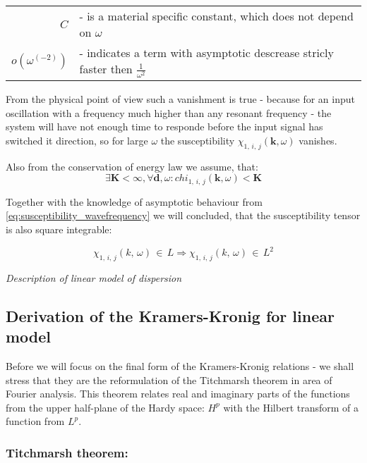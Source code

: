 \documentclass[12pt,twoside,a4paper]{article}
\numberwithin{equation}{subsection}
\numberwithin{figure}{subsection}
\begin{document}
\begin{tabular}{r l}
  $C$ & - is a material specific constant, which does not depend on $\omega $ \\
  $o(\omega ^{( - 2)})$ & - indicates a term with asymptotic descrease stricly faster then $\frac {1}{\omega ^{2}}$ \\
\end{tabular}


From the physical point of view such a vanishment is true - because for an input oscillation with a frequency much higher than any
resonant frequency - the system will have not enough time to responde before the input signal has switched it direction, so for large
$\omega $ the susceptibility ${\chi_{1, \,i, \,j}}(\textbf{k},\omega )$ vanishes.


Also from the conservation of energy law we assume, that:
\begin{equation} \label{eq:susceptibility_conservation}
  \exists \textbf{K} < \infty, \forall \textbf{d}, \omega : chi_{1, \,i, \,j}(\textbf{k}, \omega) < \textbf{K}
\end{equation}


Together with the knowledge of asymptotic behaviour from \ref{eq:susceptibility_wavefrequency} we will concluded, that the susceptibility
tensor is also square integrable:

\begin{equation} \label{eq:susceptibility_sqrintegrable}
  \chi_{1, \,i, \,j}(k, \,\omega ) \,\in \,L \Rightarrow \chi_{1, \,i, \,j} (k, \,\omega )\,\in\,L^{2}
\end{equation}


\textit{Description of linear model of dispersion}

\subsection{Derivation of the Kramers-Kronig for linear model} \label{chap:problem_dlin}

Before we will focus on the final form of the Kramers-Kronig relations - we shall stress that they are the reformulation of the Titchmarsh theorem
in area of Fourier analysis. This theorem relates real and imaginary parts of the functions from the upper half-plane of the Hardy space:
$H^{p}$ with the Hilbert transform of a function from $L^{p}$.

\subsubsection*{Titchmarsh theorem:}
\end{document}
